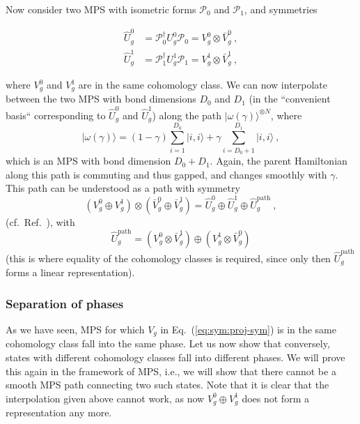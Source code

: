 \documentclass[twocolumn,superscriptaddress,prb,linenumbers]{revtex4-1}
\newcommand{\ket}[1]{\vert#1\rangle}
\newcommand{\mc}[1]{\mathcal{#1}}
\begin{document}
Now consider two MPS with isometric forms $\mc P_0$ and $\mc P_1$, and
symmetries
\begin{linenomath}
    \begin{align*}
        \hat U_g^0 & = \mc P_0^\dagger U_g^0 \mc P_0 = V^0_g \otimes \bar V^0_g\ , \\
        \hat U_g^1 & = \mc P_1^\dagger U_g^1 \mc P_1 = V^1_g \otimes \bar V^1_g\ ,
    \end{align*}
\end{linenomath}
where $V^0_g$ and $V^1_g$ are in the same cohomology class.
We can now interpolate between the two MPS with bond dimensions $D_0$ and
$D_1$ (in the ``convenient basis`` corresponding to $\hat U_g^0$ and $\hat
    U_g^1$) along the path $\ket{\omega(\gamma)}^{\otimes N}$, where
\begin{equation}
    \label{eq:sym:omega-gamma}
    \ket{\omega(\gamma)} = (1-\gamma) \sum_{i=1}^{D_0}\ket{i,i}
    + \gamma\sum_{i=D_0+1}^{D_1}\ket{i,i}\ ,
\end{equation}
which is an MPS with bond dimension $D_0+D_1$.
Again, the parent
Hamiltonian along this path is commuting and thus gapped, and changes
smoothly with $\gamma$. This path can be understood as a path with
symmetry
\begin{equation}
    \label{eq:1d-sym:jointsym}
    (V^0_g\oplus V^1_g)\otimes (\bar V^0_g\oplus
    \bar V^1_g) = \hat U_g^0 \oplus \hat U_g^1 \oplus \hat U^\mathrm{path}_g\
    ,
\end{equation}
(cf.~Ref.~), with
\[
    \hat U^\mathrm{path}_g = (V^0_g\otimes \bar V^1_g)
    \oplus (V^1_g\otimes \bar V^0_g)
\]
(this is where equality of the cohomology classes is required, since only
then $\hat U^\mathrm{path}_g$ forms a linear representation).


\subsubsection{Separation of phases
    \label{subsubsec:sym-inj-separation}}



As we have seen, MPS for which $V_g$ in Eq.~(\ref{eq:sym:proj-sym}) is in
the same cohomology class fall into the same phase. Let us now show that
conversely, states with different cohomology classes
fall into different phases.  We will prove
this again in the framework of MPS, i.e., we will show that there cannot
be a smooth MPS path connecting two such states.  Note that it is
clear that the interpolation given above cannot work, as now $V^0_g\oplus
    V^1_g$ does not form a representation any more.
\end{document}
